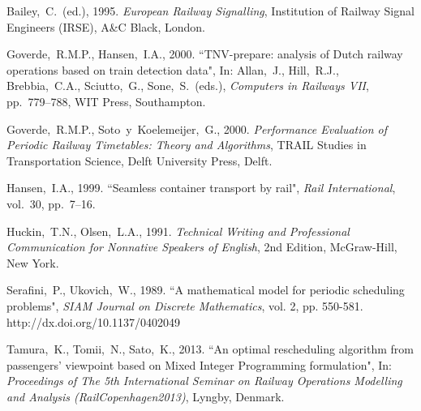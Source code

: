 \documentclass[10pt,a4paper,oneside,onecolumn]{article}
\begin{document}
\begin{thebibliography}{99}
	\setlength{\itemsep}{0\parskip}

	Bailey,~C.~(ed.), 1995.
	{\em European Railway Signalling},
	Institution of Railway Signal Engineers (IRSE),
	A\&C Black, London.

	Goverde,~R.M.P., Hansen,~I.A., 2000.
	``TNV-prepare: analysis of Dutch railway operations
	based on train detection data",
	In: Allan,~J., Hill,~R.J., Brebbia,~C.A., Sciutto,~G., Sone,~S.~(eds.),
	{\em Computers in Railways VII},
	pp.~779--788,
	WIT Press, Southampton.

	Goverde,~R.M.P., Soto~y~Koelemeijer,~G., 2000.
	{\em Performance Evaluation of Periodic Railway Timetables:
		Theory and Algorithms},
	TRAIL Studies in Transportation Science,
	Delft University Press, Delft.

	Hansen,~I.A., 1999.
	``Seamless container transport by rail",
	{\em Rail International},
	vol.~30, pp.~7--16.

	Huckin,~T.N., Olsen,~L.A., 1991.
	{\em Technical Writing and Professional Communication
		for Nonnative Speakers of English},
	2nd Edition, McGraw-Hill, New York.

	Serafini,~P., Ukovich,~W., 1989.
	``A mathematical model for periodic scheduling problems",
	{\em SIAM Journal on Discrete Mathematics},
	vol. 2, pp. 550-581.
	http://dx.doi.org/10.1137/0402049

	Tamura,~K., Tomii,~N., Sato,~K., 2013.
	``An optimal rescheduling algorithm from passengers' viewpoint
	based on Mixed Integer Programming formulation",
	In: {\em Proceedings of The 5th International Seminar
		on Railway Operations Modelling and Analysis (RailCopenhagen2013)},
	Lyngby, Denmark.
\end{thebibliography}

\end{document}
